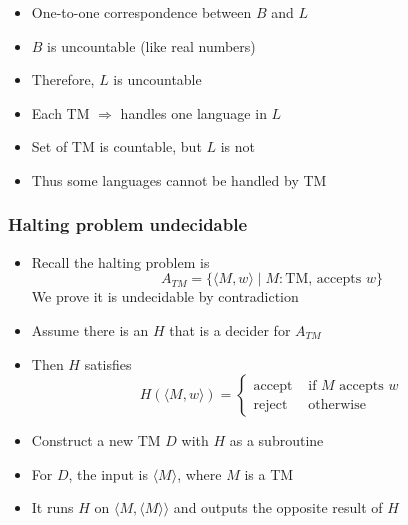 \begin{frame}[allowframebreaks]
\begin{itemize}
\item One-to-one correspondence between $B$ and $L$

\item $B$ is uncountable (like real numbers)

\item [] Therefore, $L$ is uncountable
\item Each TM $\Rightarrow$ handles one language in $L$

\item [] Set of TM is countable, but $L$ is not

\item Thus some languages cannot be handled by TM
\end{itemize}\end{frame}

\begin{frame}[allowframebreaks] \frametitle{Halting problem undecidable}
  \begin{itemize}
\item Recall the halting problem is
  \begin{equation*}
A_{TM}
=\{\langle M,w \rangle \mid M: \mbox{TM, accepts } w\}
\end{equation*}
We prove it is undecidable
by contradiction
\item Assume there is an $H$ that is a decider for $A_{TM}$
\item [] Then $H$ satisfies
  \begin{equation*}
    H(\langle  M,w\rangle )=
    \begin{cases}
      \mbox{accept} & \mbox{ if } M \mbox{ accepts } w\\
\mbox{reject} & \mbox{ otherwise}
    \end{cases}
  \end{equation*}
\item Construct a new TM $D$ with $H$ as a subroutine

\item For $D$, the input is $\langle  M\rangle $, where
  $M$ is a TM

\item [] It runs $H$ on $\langle  M,\langle  M\rangle \rangle $
and 
outputs the opposite result of $H$





\end{itemize}
\end{frame}
